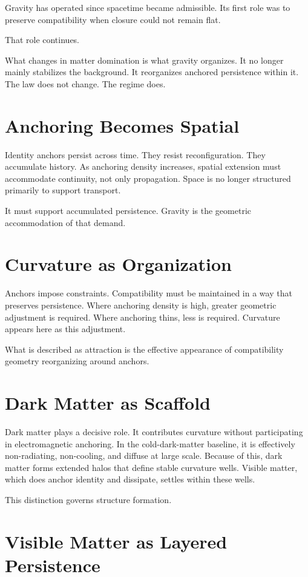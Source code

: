 \documentclass[11pt,twoside,openright]{book}
\begin{document}
Gravity has operated since spacetime became admissible. Its first role was to preserve compatibility when closure could not remain flat.

That role continues.

What changes in matter domination is what gravity organizes. It no longer mainly stabilizes the background. It reorganizes anchored persistence within it. The law does not change. The regime does.

\section*{Anchoring Becomes Spatial}

Identity anchors persist across time. They resist reconfiguration. They accumulate history. As anchoring density increases, spatial extension must accommodate continuity, not only propagation. Space is no longer structured primarily to support transport.

It must support accumulated persistence. Gravity is the geometric accommodation of that demand.

\section*{Curvature as Organization}

Anchors impose constraints. Compatibility must be maintained in a way that preserves persistence. Where anchoring density is high, greater geometric adjustment is required. Where anchoring thins, less is required. Curvature appears here as this adjustment.

What is described as attraction is the effective appearance of compatibility geometry reorganizing around anchors.

\section*{Dark Matter as Scaffold}

Dark matter plays a decisive role. It contributes curvature without participating in electromagnetic anchoring. In the cold-dark-matter baseline, it is effectively non-radiating, non-cooling, and diffuse at large scale. Because of this, dark matter forms extended halos that define stable curvature wells. Visible matter, which does anchor identity and dissipate, settles within these wells.

This distinction governs structure formation.

\section*{Visible Matter as Layered Persistence}
\end{document}
